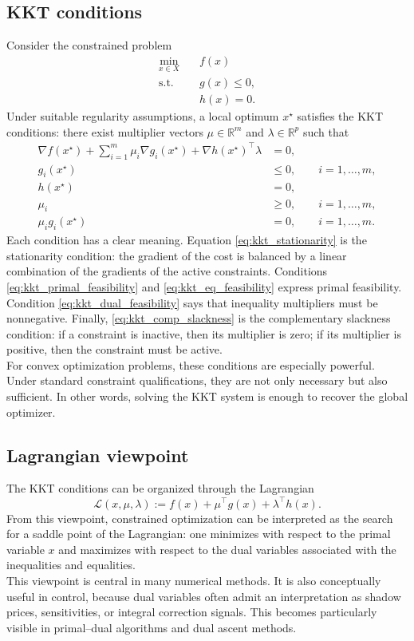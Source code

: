 \subsection{KKT conditions}
Consider the constrained problem
$$
\begin{aligned}
    \min_{x \in X} \quad & f(x) \\
    \text{s.t.} \quad & g(x) \leq 0, \\
                      & h(x) = 0.
\end{aligned}
$$
Under suitable regularity assumptions, a local optimum $x^\star$ satisfies the KKT conditions: there exist multiplier vectors $\mu \in \mathbb{R}^m$ and $\lambda \in \mathbb{R}^p$ such that
\begin{align}
    \nabla f(x^\star) + \sum_{i=1}^m \mu_i \nabla g_i(x^\star) + \nabla h(x^\star)^\top \lambda &= 0,
    \label{eq:kkt_stationarity} \\
    g_i(x^\star) &\leq 0, \qquad i=1,\dots,m, \label{eq:kkt_primal_feasibility} \\
    h(x^\star) &= 0, \label{eq:kkt_eq_feasibility} \\
    \mu_i &\geq 0, \qquad i=1,\dots,m, \label{eq:kkt_dual_feasibility} \\
    \mu_i g_i(x^\star) &= 0, \qquad i=1,\dots,m. \label{eq:kkt_comp_slackness}
\end{align}
Each condition has a clear meaning. Equation \eqref{eq:kkt_stationarity} is the stationarity condition: the gradient of the cost is balanced by a linear combination of the gradients of the active constraints. Conditions \eqref{eq:kkt_primal_feasibility} and \eqref{eq:kkt_eq_feasibility} express primal feasibility. Condition \eqref{eq:kkt_dual_feasibility} says that inequality multipliers must be nonnegative. Finally, \eqref{eq:kkt_comp_slackness} is the complementary slackness condition: if a constraint is inactive, then its multiplier is zero; if its multiplier is positive, then the constraint must be active.\\
For convex optimization problems, these conditions are especially powerful. Under standard constraint qualifications, they are not only necessary but also sufficient. In other words, solving the KKT system is enough to recover the global optimizer.

\subsection{Lagrangian viewpoint}
The KKT conditions can be organized through the Lagrangian
$$
    \mathcal{L}(x,\mu,\lambda)
    :=
    f(x) + \mu^\top g(x) + \lambda^\top h(x).
$$
From this viewpoint, constrained optimization can be interpreted as the search for a saddle point of the Lagrangian: one minimizes with respect to the primal variable $x$ and maximizes with respect to the dual variables associated with the inequalities and equalities.\\
This viewpoint is central in many numerical methods. It is also conceptually useful in control, because dual variables often admit an interpretation as shadow prices, sensitivities, or integral correction signals. This becomes particularly visible in primal--dual algorithms and dual ascent methods.\\

